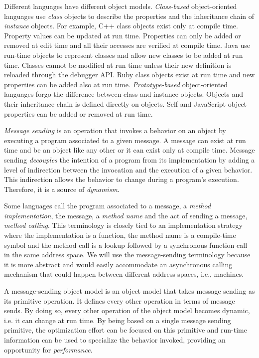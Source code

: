 Different languages have different object models. \textit{Class-based}
object-oriented languages use \textit{class} objects to describe the properties
and the inheritance chain of \textit{instance} objects. For example, C++ class
objects exist only at compile time. Property values can be updated at run time.
Properties can only be added or removed at edit time and all their accesses are
verified at compile time. Java use run-time objects to represent classes and
allow new classes to be added at run time.  Classes cannot be modified at run
time unless their new definition is reloaded through the debugger API. Ruby
class objects exist at run time and new properties can be added also at run
time. \textit{Prototype-based} object-oriented languages forgo the difference
between class and instance objects. Objects and their inheritance chain is
defined directly on objects. Self and JavaScript object properties can be
added or removed at run time. 

\textit{Message sending} is an operation that invokes a behavior on an object by
executing a program associated to a given message.  A message can exist at run
time and be an object like any other or it can exist only at compile time.
Message sending \textit{decouples} the intention of a program from its
implementation by adding a level of indirection between the invocation and the
execution of a given behavior. This indirection allows the behavior to change
during a program's execution. Therefore, it is a source of \textit{dynamism}.

Some languages call the program associated to a message, a \textit{method
implementation}, the message, a \textit{method name} and the act of sending a
message, \textit{method calling}. This terminology is closely tied to an
implementation strategy where the implementation is a function, the method name
is a compile-time symbol and the method call is a lookup followed by a
synchronous function call in the same address space. We will use the
message-sending terminology because it is more abstract and would easily
accommodate an asynchronous calling mechanism that could happen between different
address spaces, i.e., machines. 

A message-sending object model is an object model that takes message sending as
its primitive operation. It defines every other operation in terms of message
sends. By doing so, every other operation of the object model becomes dynamic,
i.e. it can change at run time. By being based on a single message sending
primitive, the optimization effort can be focused on this primitive and
run-time information can be used to specialize the behavior invoked, providing
an opportunity for \textit{performance}. 

